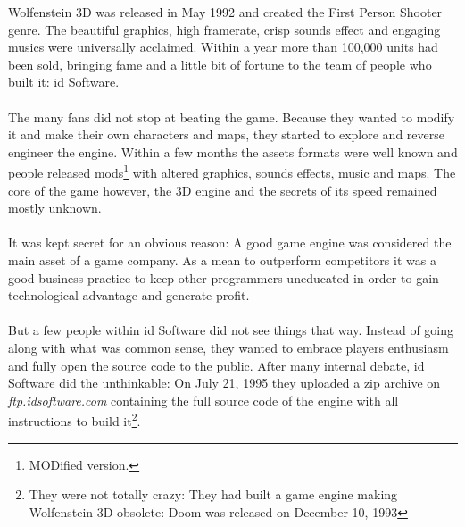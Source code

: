 Wolfenstein 3D was released in May 1992 and created the First Person Shooter genre. The beautiful graphics, high framerate, crisp sounds effect and engaging musics were universally acclaimed. Within a year more than 100,000 units had been sold, bringing fame and a little bit of fortune to the team of people who built it: id Software.\\
\\
The many fans did not stop at beating the game. Because they wanted to modify it and make their own characters and maps, they started to explore and reverse engineer the engine. Within a few months the assets formats were well known and people released mods\footnote{MODified version.} with altered graphics, sounds effects, music and maps. The core of the game however, the 3D engine and the secrets of its speed remained mostly unknown.\\
\\
It was kept secret for an obvious reason: A good game engine was considered the main asset of a game company. As a mean to outperform competitors it was a good business practice to keep other programmers  uneducated in order to gain technological advantage and generate profit.\\
\\
But a few people within id Software did not see things that way. Instead of going along with what was common sense, they wanted to embrace players enthusiasm and fully open the source code to the public. After many internal debate, id Software did the unthinkable: On July 21, 1995 they uploaded a zip archive on \emph{ftp.idsoftware.com} containing the full source code of the engine with all instructions to build it\footnote{They were not totally crazy: They had built a game engine making Wolfenstein 3D obsolete: Doom was released on December 10, 1993}.\\

